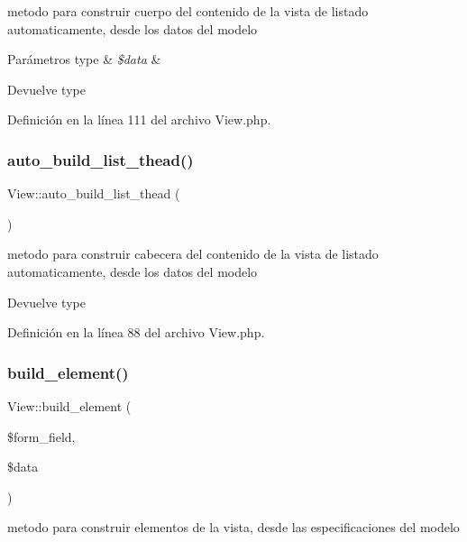 metodo para construir cuerpo del contenido de la vista de listado automaticamente, desde los datos del modelo


\begin{DoxyParams}[1]{Parámetros}
type & {\em \$data} & \\
\hline
\end{DoxyParams}
\begin{DoxyReturn}{Devuelve}
type 
\end{DoxyReturn}


Definición en la línea 111 del archivo View.\+php.

\mbox{\label{class_view_ac55cd1801295517a7f9fad0d41ddf6d1}} 
\subsubsection{\texorpdfstring{auto\_build\_list\_thead()}{auto\_build\_list\_thead()}}
{\footnotesize\ttfamily View\+::auto\+\_\+build\+\_\+list\+\_\+thead (\begin{DoxyParamCaption}{ }\end{DoxyParamCaption})}

metodo para construir cabecera del contenido de la vista de listado automaticamente, desde los datos del modelo

\begin{DoxyReturn}{Devuelve}
type 
\end{DoxyReturn}


Definición en la línea 88 del archivo View.\+php.

\mbox{\label{class_view_ab2f8d0f1c16e7971856e5535d9fc286e}} 
\subsubsection{\texorpdfstring{build\_element()}{build\_element()}}
{\footnotesize\ttfamily View\+::build\+\_\+element (\begin{DoxyParamCaption}\item[{}]{\$form\+\_\+field,  }\item[{}]{\$data }\end{DoxyParamCaption})}

metodo para construir elementos de la vista, desde las especificaciones del modelo


